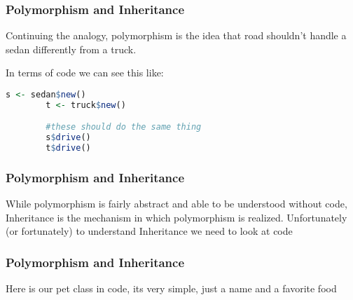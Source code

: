 \documentclass{beamer}
\begin{document}
\begin{frame}[fragile]
    \frametitle{Polymorphism and Inheritance}
    Continuing the analogy, polymorphism is the idea that road shouldn't handle a sedan differently from a truck. \newline

    In terms of code we can see this like:
    \begin{lstlisting}[language=R]
        s <- sedan$new()
        t <- truck$new()

        #these should do the same thing
        s$drive()
        t$drive()
    \end{lstlisting}

\end{frame}
\begin{frame}
    \frametitle{Polymorphism and Inheritance}
    While polymorphism is fairly abstract and able to be understood without code, Inheritance is the mechanism in which polymorphism is realized. \newline
    Unfortunately (or fortunately) to understand Inheritance we need to look at code

\end{frame}


\begin{frame}[fragile]
    \frametitle{Polymorphism and Inheritance}
    Here is our pet class in code, its very simple, just a name and a favorite food
 
\end{frame}
\end{document}
